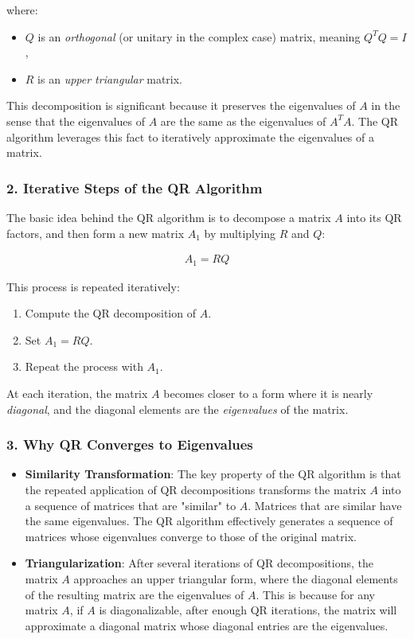 \documentclass[article]{IEEEtran}
\numberwithin{equation}{enumi}
\numberwithin{figure}{enumi}
\begin{document}
where:\\
\begin{itemize}
    \item $Q$ is an \textit{orthogonal} (or unitary in the complex case) matrix, meaning $Q^T Q = I$,
    \item $R$ is an \textit{upper triangular} matrix.
\end{itemize}

This decomposition is significant because it preserves the eigenvalues of $A$ in the sense that the eigenvalues of $A$ are the same as the eigenvalues of $A^T A$. The QR algorithm leverages this fact to iteratively approximate the eigenvalues of a matrix.

\subsubsection{2. Iterative Steps of the QR Algorithm}
The basic idea behind the QR algorithm is to decompose a matrix $A$ into its QR factors, and then form a new matrix $A_1$ by multiplying $R$ and $Q$:

\begin{align*}
\boxed{A_1 = RQ}
\end{align*}

This process is repeated iteratively:
\begin{enumerate}
    \item Compute the QR decomposition of $A$.
    \item Set $A_1 = RQ$.
    \item Repeat the process with $A_1$.
\end{enumerate}

At each iteration, the matrix $A$ becomes closer to a form where it is nearly \textit{diagonal}, and the diagonal elements are the \textit{eigenvalues} of the matrix.

\subsubsection{3. Why QR Converges to Eigenvalues}
\begin{itemize}
    \item \textbf{Similarity Transformation}: The key property of the QR algorithm is that the repeated application of QR decompositions transforms the matrix $A$ into a sequence of matrices that are "similar" to $A$. Matrices that are similar have the same eigenvalues. The QR algorithm effectively generates a sequence of matrices whose eigenvalues converge to those of the original matrix.
    \item \textbf{Triangularization}: After several iterations of QR decompositions, the matrix $A$ approaches an upper triangular form, where the diagonal elements of the resulting matrix are the eigenvalues of $A$. This is because for any matrix $A$, if $A$ is diagonalizable, after enough QR iterations, the matrix will approximate a diagonal matrix whose diagonal entries are the eigenvalues.
\end{itemize}
\end{document}
